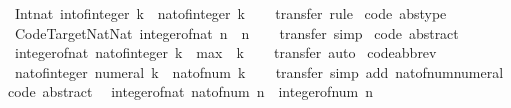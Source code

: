 \begin{isabellebody}
\ \ {\isachardoublequoteopen}Int{\isachardot}nat\ {\isacharparenleft}int{\isacharunderscore}of{\isacharunderscore}integer\ k{\isacharparenright}\ {\isacharequal}\ nat{\isacharunderscore}of{\isacharunderscore}integer\ k{\isachardoublequoteclose}\isanewline
%
\isadelimproof
\ \ %
\endisadelimproof
%
\isatagproof
{}\isamarkupfalse%
\ transfer\ rule%
\endisatagproof
{\isafoldproof}%
%
\isadelimproof
\isanewline
%
\endisadelimproof
\isanewline
{}\isamarkupfalse%
\ {\isacharbrackleft}code\ abstype{\isacharbrackright}{\isacharcolon}\isanewline
\ \ {\isachardoublequoteopen}Code{\isacharunderscore}Target{\isacharunderscore}Nat{\isachardot}Nat\ {\isacharparenleft}integer{\isacharunderscore}of{\isacharunderscore}nat\ n{\isacharparenright}\ {\isacharequal}\ n{\isachardoublequoteclose}\isanewline
%
\isadelimproof
\ \ %
\endisadelimproof
%
\isatagproof
{}\isamarkupfalse%
\ transfer\ simp%
\endisatagproof
{\isafoldproof}%
%
\isadelimproof
\isanewline
%
\endisadelimproof
\isanewline
{}\isamarkupfalse%
\ {\isacharbrackleft}code\ abstract{\isacharbrackright}{\isacharcolon}\isanewline
\ \ {\isachardoublequoteopen}integer{\isacharunderscore}of{\isacharunderscore}nat\ {\isacharparenleft}nat{\isacharunderscore}of{\isacharunderscore}integer\ k{\isacharparenright}\ {\isacharequal}\ max\ {}\ k{\isachardoublequoteclose}\isanewline
%
\isadelimproof
\ \ %
\endisadelimproof
%
\isatagproof
{}\isamarkupfalse%
\ transfer\ auto%
\endisatagproof
{\isafoldproof}%
%
\isadelimproof
\isanewline
%
\endisadelimproof
\isanewline
{}\isamarkupfalse%
\ {\isacharbrackleft}code{\isacharunderscore}abbrev{\isacharbrackright}{\isacharcolon}\isanewline
\ \ {\isachardoublequoteopen}nat{\isacharunderscore}of{\isacharunderscore}integer\ {\isacharparenleft}numeral\ k{\isacharparenright}\ {\isacharequal}\ nat{\isacharunderscore}of{\isacharunderscore}num\ k{\isachardoublequoteclose}\isanewline
%
\isadelimproof
\ \ %
\endisadelimproof
%
\isatagproof
{}\isamarkupfalse%
\ transfer\ {\isacharparenleft}simp\ add{\isacharcolon}\ nat{\isacharunderscore}of{\isacharunderscore}num{\isacharunderscore}numeral{\isacharparenright}%
\endisatagproof
{\isafoldproof}%
%
\isadelimproof
\isanewline
%
\endisadelimproof
\isanewline
{}\isamarkupfalse%
\ {\isacharbrackleft}code\ abstract{\isacharbrackright}{\isacharcolon}\isanewline
\ \ {\isachardoublequoteopen}integer{\isacharunderscore}of{\isacharunderscore}nat\ {\isacharparenleft}nat{\isacharunderscore}of{\isacharunderscore}num\ n{\isacharparenright}\ {\isacharequal}\ integer{\isacharunderscore}of{\isacharunderscore}num\ n{\isachardoublequoteclose}\isanewline

\end{isabellebody}
